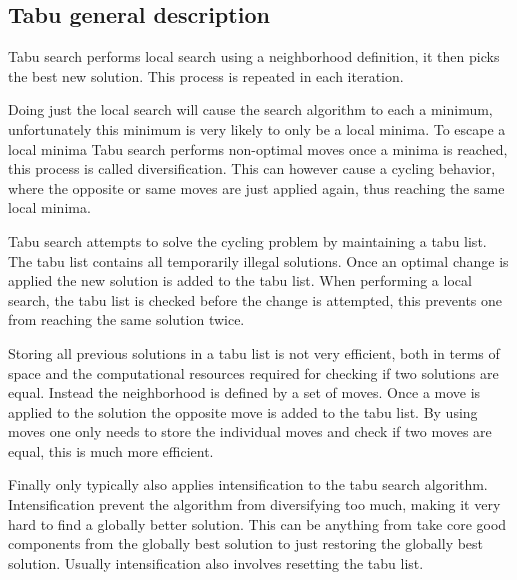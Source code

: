 \subsection{Tabu general description}

Tabu search performs local search using a neighborhood definition, it then picks the best new solution. This process is repeated in each iteration.

Doing just the local search will cause the search algorithm to each a minimum, unfortunately this minimum is very likely to only be a local minima. To escape a local minima Tabu search performs non-optimal moves once a minima is reached, this process is called diversification. This can however cause a cycling behavior, where the opposite or same moves are just applied again, thus reaching the same local minima.

Tabu search attempts to solve the cycling problem by maintaining a tabu list. The tabu list contains all temporarily illegal solutions. Once an optimal change is applied the new solution is added to the tabu list. When performing a local search, the tabu list is checked before the change is attempted, this prevents one from reaching the same solution twice.

Storing all previous solutions in a tabu list is not very efficient, both in terms of space and the computational resources required for checking if two solutions are equal. Instead the neighborhood is defined by a set of moves. Once a move is applied to the solution the opposite move is added to the tabu list. By using moves one only needs to store the individual moves and check if two moves are equal, this is much more efficient.

Finally only typically also applies intensification to the tabu search algorithm. Intensification prevent the algorithm from diversifying too much, making it very hard to find a globally better solution. This can be anything from take core good components from the globally best solution to just restoring the globally best solution. Usually intensification also involves resetting the tabu list.

